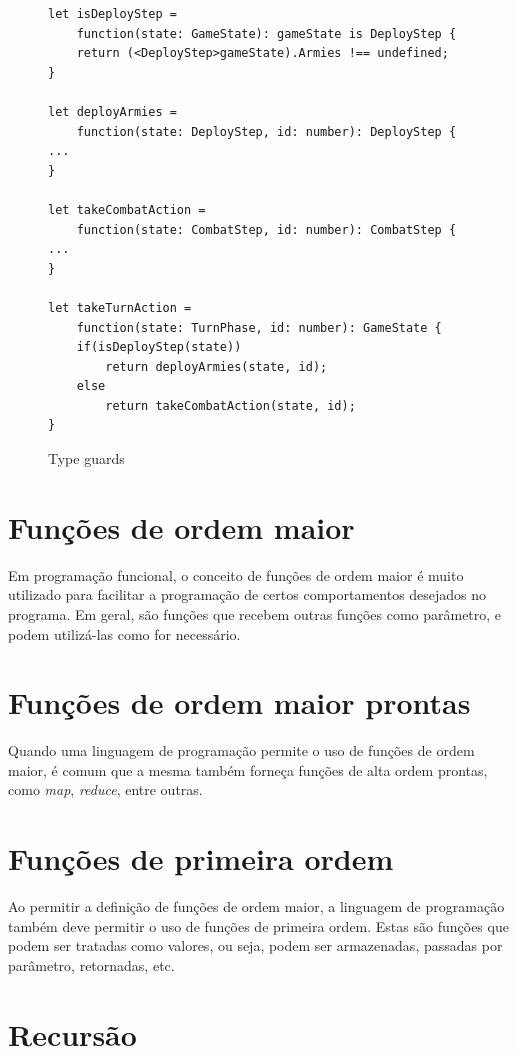 \documentclass[rel_mlp]{iiufrgs}
\numberwithin{figure}{chapter}
\begin{document}
\begin{figure}[h]
\begin{verbatim}
let isDeployStep =
    function(state: GameState): gameState is DeployStep {
    return (<DeployStep>gameState).Armies !== undefined;
}

let deployArmies =
    function(state: DeployStep, id: number): DeployStep {
...
}

let takeCombatAction =
    function(state: CombatStep, id: number): CombatStep {
...
}

let takeTurnAction =
    function(state: TurnPhase, id: number): GameState {
    if(isDeployStep(state))
        return deployArmies(state, id);
    else
        return takeCombatAction(state, id);
}
\end{verbatim}
\caption{Type guards}
\label{fig:typeguards}
\end{figure}

\section{Funções de ordem maior}

Em programação funcional, o conceito de funções de ordem maior é muito utilizado para facilitar a programação de certos comportamentos desejados no programa. Em geral, são funções que recebem outras funções como parâmetro, e podem utilizá-las como for necessário.


\section{Funções de ordem maior prontas}

Quando uma linguagem de programação permite o uso de funções de ordem maior, é comum que a mesma também forneça funções de alta ordem prontas, como \textit{map}, \textit{reduce}, entre outras. 


\section{Funções de primeira ordem}

Ao permitir a definição de funções de ordem maior, a linguagem de programação também deve permitir o uso de funções de primeira ordem. Estas são funções que podem ser tratadas como valores, ou seja, podem ser armazenadas, passadas por parâmetro, retornadas, etc.


\section{Recursão}
\end{document}
